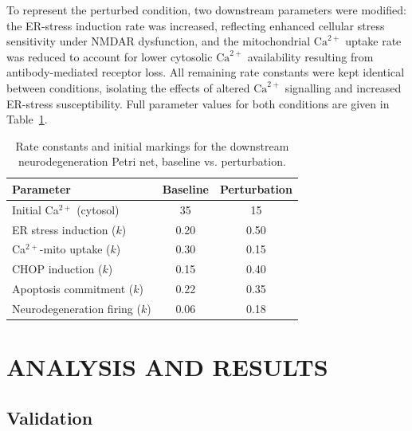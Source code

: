 \documentclass[a4paper,twoside]{article}
\begin{document}
To represent the perturbed condition, two downstream parameters were modified: the ER-stress induction rate was increased, reflecting enhanced cellular stress sensitivity under NMDAR dysfunction, and the mitochondrial $\mathrm{Ca}^{2+}$ uptake rate was reduced to account for lower cytosolic $\mathrm{Ca}^{2+}$ availability resulting from antibody-mediated receptor loss. All remaining rate constants were kept identical between conditions, isolating the effects of altered 
$\mathrm{Ca}^{2+}$ signalling and increased ER-stress susceptibility. Full parameter values for both conditions are given in Table~\ref{tab:parameters}.

\begin{table}[h]
\caption{Rate constants and initial markings for the downstream neurodegeneration Petri net, baseline vs. perturbation.}
\label{tab:parameters}
\centering
{\small
\begin{tabular}{|l|c|c|}
\hline
\textbf{Parameter} & \textbf{Baseline} & \textbf{Perturbation} \\
\hline
Initial Ca$^{2+}$ (cytosol) & 35 & 15 \\
ER stress induction ($k$) & 0.20 & 0.50 \\
Ca$^{2+}$-mito uptake ($k$) & 0.30 & 0.15 \\
CHOP induction ($k$) & 0.15 & 0.40\\
Apoptosis commitment ($k$) & 0.22 & 0.35 \\
Neurodegeneration firing ($k$) & 0.06 & 0.18 \\
\hline
\end{tabular}
}
\end{table}

\section{\uppercase{Analysis and Results}}

\subsection{Validation}

\end{document}
